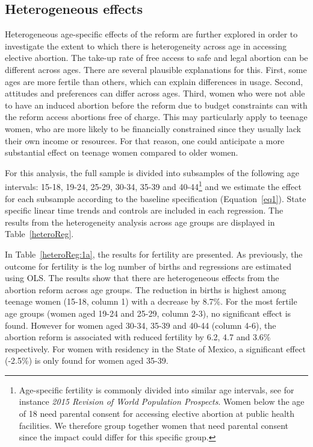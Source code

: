\documentclass[a4paper, 11pt]{article}
\begin{document}
\begin{spacing}{2}
\subsection{Heterogeneous effects}\label{heteroSection}

Heterogeneous age-specific effects of the reform are further explored in order to investigate the extent to which there is heterogeneity across age in accessing elective abortion. The take-up rate of free access to safe and legal abortion can be different across ages. There are several plausible explanations for this. First, some ages are more fertile than others, which can explain differences in usage. Second, attitudes and preferences can differ across ages. Third, women who were not able to have an induced abortion before the reform due to budget constraints can with the reform access abortions free of charge. This may particularly apply to teenage women, who are more likely to be financially constrained since they usually lack their own income or resources. For that reason, one could anticipate a more substantial effect on teenage women compared to older women. 

For this analysis, the full sample is divided into subsamples of the following age intervals: 15-18, 19-24, 25-29, 30-34, 35-39 and 40-44\footnote{Age-specific fertility is commonly divided into similar age intervals, see for instance \textit{2015 Revision of World Population Prospects}. Women below the age of 18 need parental consent for accessing elective abortion at public health facilities. We therefore group together women that need parental consent since the impact could differ for this specific group.} and we estimate the effect for each subsample according to the baseline specification (Equation~\eqref{eq1}).  State specific linear time trends and controls are included in each regression. The results from the heterogeneity analysis across age groups are displayed in Table~\ref{heteroReg}. 

In Table~\ref{heteroReg:1a}, the results for fertility are presented. As previously, the outcome for fertility is the log number of births and regressions are estimated using OLS. The results show that there are heterogeneous effects from the abortion reform across age groups. The reduction in births is highest among teenage women (15-18, column 1) with a decrease by 8.7\%. For the most fertile age groups (women aged 19-24 and 25-29, column 2-3), no significant effect is found. However for women aged 30-34, 35-39 and 40-44 (column 4-6), the abortion reform is associated with reduced fertility by 6.2, 4.7 and 3.6\% respectively. For women with residency in the State of Mexico, a significant effect (-2.5\%) is only found for women aged 35-39.   
  

\end{spacing}
\end{document}
